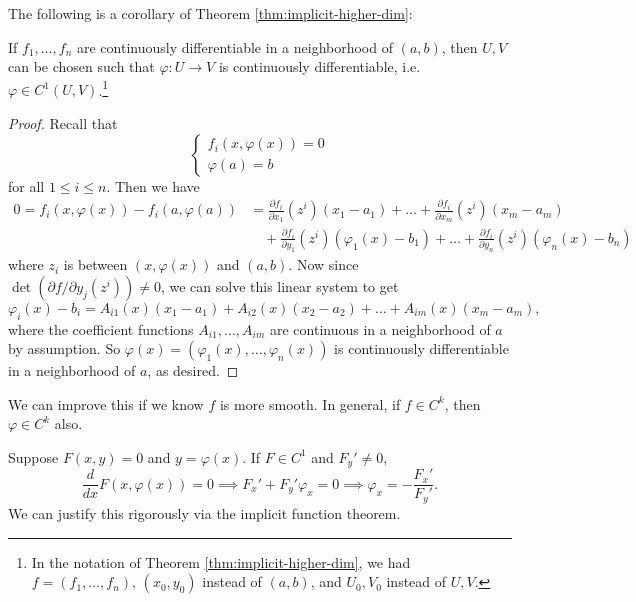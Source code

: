 The following is a corollary of Theorem \ref{thm:implicit-higher-dim}:
\begin{corollary}
  If $f_1, \dots, f_n$ are continuously differentiable
  in a neighborhood of $(a, b)$, then $U, V$ can be
  chosen such that $\varphi : U \to V$ is continuously
  differentiable, i.e. $\varphi \in C^1(U, V)$.\footnote{In the notation of Theorem \ref{thm:implicit-higher-dim}, we had $f = (f_1, \dots, f_n)$, $(x_0, y_0)$ instead of $(a, b)$, and $U_0, V_0$ instead of $U, V$.}
\end{corollary}

\begin{proof}
  Recall that
  \[
    \begin{cases}
      f_i(x, \varphi(x)) = 0 \\
      \varphi(a) = b
    \end{cases}
  \]
  for all $1 \le i \le n$. Then we have
  \begin{align*}
    0 = f_i(x, \varphi(x)) - f_i(a, \varphi(a))
    &= \frac{\partial f_i}{\partial x_1} (z^i)(x_1 - a_1)
    + \dots + \frac{\partial f_i}{\partial x_m} (z^i)(x_m - a_m) \\
    & \quad + \frac{\partial f_i}{\partial y_1} (z^i)(\varphi_1(x) - b_1)
    + \dots + \frac{\partial f_i}{\partial y_n} (z^i)(\varphi_n(x) - b_n)
  \end{align*}
  where $z_i$ is between $(x, \varphi(x))$ and $(a, b)$.
  Now since
  $\det(\partial f / \partial y_j (z^i)) \ne 0$, we
  can solve this linear system to get
  \[
    \varphi_i(x) - b_i =
    A_{i 1}(x)(x_1 - a_1) + A_{i 2}(x)(x_2 - a_2) + \dots + A_{i m}(x)(x_m - a_m),
  \]
  where the coefficient functions $A_{i 1}, \dots, A_{i m}$
  are continuous in a neighborhood of $a$ by assumption.
  So
  $\varphi(x) = (\varphi_1(x), \dots, \varphi_n(x))$
  is continuously differentiable in a neighborhood of
  $a$, as desired.
\end{proof}

\begin{remark}
  We can improve this if we know $f$ is more smooth.
  In general, if $f \in C^k$, then $\varphi \in C^k$ also.
\end{remark}

\begin{example}
  Suppose $F(x, y) = 0$ and $y = \varphi(x)$. If
  $F \in C^1$ and $F_y' \ne 0$,
  \[
    \frac{d}{dx} F(x, \varphi(x)) = 0
    \implies F_x' + F_y' \varphi_x = 0
    \implies \varphi_x = -\frac{F_x'}{F_y'}.
  \]
  We can justify this rigorously via the implicit
  function theorem.
\end{example}

